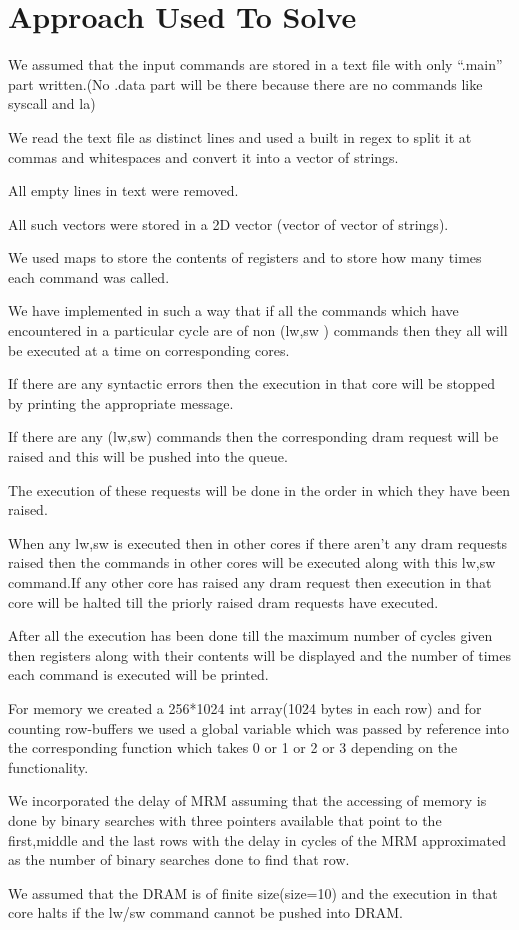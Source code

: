 \documentclass[12pt]{article}
\begin{document}
\section{Approach Used To Solve}
\begin{itemize}
\normalsize{
\item We assumed that the input commands are stored in a text file with only “.main” part written.(No .data part will be there because there are no commands like syscall and la)
\item We read the text file as distinct lines and used a built in regex to split it at commas and whitespaces and convert it into a vector of strings.
\item All empty lines in text were removed.
\item All such vectors were stored in a 2D vector (vector of vector of strings).
\item We used maps to store the contents of registers and to store how many times each command was called.
\item We have implemented in such a way that if all the commands which have encountered in a particular cycle are of non (lw,sw ) commands then they all will be executed at a time on corresponding cores.
\item If there are any syntactic errors then the execution in that core will be stopped by printing the appropriate message.
\item If there are any (lw,sw) commands then the corresponding dram request will be raised and this will be pushed into the queue.
\item The execution of these requests will be done in the order in which they have been raised.
\item When any lw,sw is executed then in other cores if there aren't any dram requests raised then the commands in other cores will be executed along with this lw,sw command.If any other core has raised any dram request then execution in that core will be halted till the priorly raised dram requests have executed.
\item After all the execution has been done till the maximum number of cycles given then registers along with their contents will be displayed and the number of times each command is executed will be printed.
\item For memory we created a 256*1024 int array(1024 bytes in each row) and for counting row-buffers we used a global variable which was passed by reference into the corresponding function which takes 0 or 1 or 2 or 3 depending on the functionality.
\item We incorporated the delay of MRM assuming that the accessing of memory is done by binary searches with three pointers available that point to the first,middle and the last rows with the delay in cycles of the MRM approximated as the number of binary searches done to find that row.
\item We assumed that the DRAM is of finite size(size=10) and the execution in that core halts if the lw/sw command cannot be pushed into DRAM.
}

\end{itemize}
\end{document}
